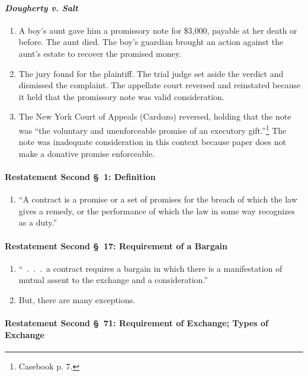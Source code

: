 \paragraph{\emph{Dougherty v. Salt}}

\begin{enumerate}
    \item A boy's aunt gave him a promissory note for \$3,000, payable at her 
    death or before. The aunt died. The boy's guardian brought an action 
    against the aunt's estate to recover the promised money.
    \item The jury found for the plaintiff. The trial judge set aside the 
    verdict and dismissed the complaint. The appellate court reversed and 
    reinstated because it held that the promissory note was valid 
    consideration.
    \item The New York Court of Appeals (Cardozo) reversed, holding that the 
    note was ``the voluntary and unenforceable promise of an executory 
    gift.''\footnote{Casebook p. 7.} The note was inadequate consideration in 
    this context because paper does not make a donative promise enforceable.
\end{enumerate}

\paragraph{Restatement Second \S\ 1: Definition}

\begin{enumerate}
    \item ``A contract is a promise or a set of promises for the breach of 
    which the law gives a remedy, or the performance of which the law in some 
    way recognizes as a duty.''
\end{enumerate}

\paragraph{Restatement Second \S\ 17: Requirement of a Bargain}

\begin{enumerate}
    \item ``~.~.~.~a contract requires a bargain in which there is a 
    manifestation of mutual assent to the exchange and a consideration.''
    \item But, there are many exceptions.
\end{enumerate}

\paragraph{Restatement Second \S\ 71: Requirement of Exchange; Types of 
Exchange}

